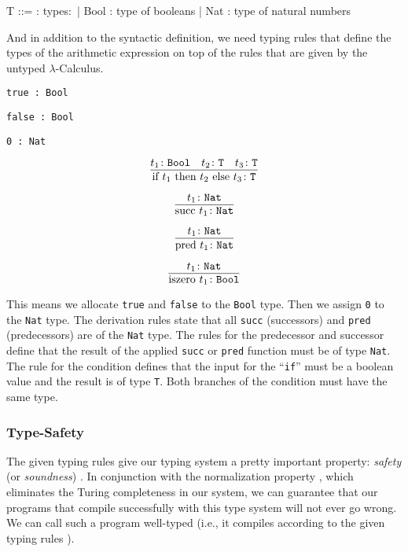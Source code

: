 \begin{bnfgrammar}
    T ::= : types$\colon$
    | Bool : type of booleans
    | Nat : type of natural numbers
\end{bnfgrammar}

And in addition to the syntactic definition, we need typing rules
that define the types of the arithmetic expression on top of
the rules that are given by the untyped $\lambda$-Calculus.

\begin{center}
    \texttt{true : Bool}
    
    \texttt{false : Bool}
    
    \texttt{0 : Nat}
\end{center}

\[\infer{ \text{if } t_1 \text{ then } t_2 \text{ else } t_3 \colon \texttt{T} }{ t_1 \colon \texttt{Bool} & t_2 \colon \texttt{T} & t_3 \colon \texttt{T} }\]

\[\infer{ \text{succ } t_1 \colon \texttt{Nat} }{ t_1 \colon \texttt{Nat} }\]

\[\infer{ \text{pred } t_1 \colon \texttt{Nat} }{ t_1 \colon \texttt{Nat} }\]

\[\infer{ \text{iszero } t_1 \colon \texttt{Bool} }{ t_1 \colon \texttt{Nat} }\]

This means we allocate \texttt{true} and \texttt{false} to the \texttt{Bool} type.
Then we assign \texttt{0} to the \texttt{Nat} type. 
The derivation rules state that all \texttt{succ} (successors) and \texttt{pred} (predecessors) are of the
\texttt{Nat} type. The rules for the predecessor and successor define that the result
of the applied \texttt{succ} or \texttt{pred} function must be of type \texttt{Nat}. The rule for the condition
defines that the input for the ``\texttt{if}'' must be a boolean value and the result is
of type \texttt{T}. Both branches of the condition must have the same type.

\subsubsection{Type-Safety}

The given typing rules give our typing system a pretty important property:
\textit{safety} (or \textit{soundness}) \cite{pierce2002ProgLang}.
In conjunction with the normalization property \cite{pierce2002ProgLang} \cite{baader_nipkow_1998},
which eliminates the Turing completeness in our system, we can guarantee that our programs
that compile successfully with this type system will not ever go wrong. We can call
such a program well-typed (i.e., it compiles according to the given typing rules \cite{cardelliTypeSystems}).

